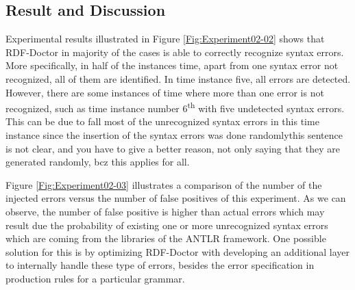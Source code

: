 \subsection{Result and Discussion}

Experimental results illustrated in Figure \ref{Fig:Experiment02-02} shows that RDF-Doctor in majority of the cases is able to correctly recognize syntax errors. 
More specifically, in half of the instances time, apart from one syntax error not recognized, all of them are identified.
In time instance five, all errors are detected.
However, there are some instances of time where more than one error is not recognized, such as time instance number 6\textsuperscript{th} with five undetected syntax errors.
This can be due to fall most of the unrecognized syntax errors in this time instance since the insertion of the syntax errors was done randomly{this sentence is not clear, and you have to give a better reason, not only saying that they are generated randomly, bcz this applies for all}.

Figure \ref{Fig:Experiment02-03} illustrates a comparison of the number of the injected errors versus the number of false positives of this experiment. 
As we can observe, the number of false positive is higher than actual errors which may result due the probability of existing one or more unrecognized syntax errors which are coming from the libraries of the ANTLR framework. 
One possible solution for this is by optimizing RDF-Doctor with developing an additional layer to internally handle these type of errors, besides the error specification in production rules for a particular grammar.


